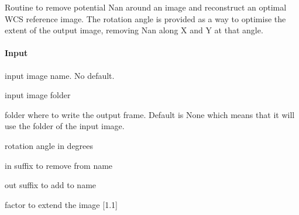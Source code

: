 \documentclass[letterpaper,10pt,english]{sphinxmanual}
\begin{document}

\begin{fulllineitems}
\label{\detokenize{api/pymusepipe:pymusepipe.mpdaf_pipe.rotate_image_wcs}}
\pysigstartsignatures
{}
\pysigstopsignatures
\sphinxAtStartPar
Routine to remove potential Nan around an image and reconstruct
an optimal WCS reference image. The rotation angle is provided as a way
to optimise the extent of the output image, removing Nan along X and Y
at that angle.


\paragraph{Input}
\label{\detokenize{api/pymusepipe:id103}}\begin{description}
\sphinxAtStartPar
input image name. No default.

\sphinxAtStartPar
input image folder

\sphinxAtStartPar
folder where to write the output frame. Default is
None which means that it will use the folder of the input image.

\sphinxAtStartPar
rotation angle in degrees

\sphinxAtStartPar
in suffix to remove from name

\sphinxAtStartPar
out suffix to add to name

\sphinxAtStartPar
factor to extend the image {[}1.1{]}

\end{description}

\end{fulllineitems}
\end{document}

